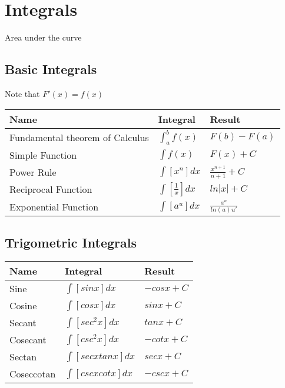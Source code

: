 \documentclass[17pt]{extarticle}
\begin{document}
\section{Integrals}
Area under the curve
\subsection{Basic Integrals}
Note that $F\prime(x)=f(x)$
\renewcommand{\arraystretch}{2}
\begin{table}[H]
\centering
\begin{tabular}{|l|l|l|}
\hline
\rowcolor{githublightgray}
Name & Integral & Result\\
\hline
Fundamental theorem of Calculus&$\int_{a}^{b}f(x)$&$F(b)-F(a)$\\
\hline
Simple Function & $\int f(x)$&$F(x)+C$\\
\hline
Power Rule & $\int [x^n]dx$&$\frac{x^{n+1}}{n+1}+C$\\
\hline
Reciprocal Function & $\int [\frac{1}{x}]dx$&$ln|x|+C$\\
\hline
Exponential Function & $\int [a^u]dx$&$\frac{a^u}{ln(a)u\prime}$\\
\hline
\end{tabular}
\end{table}

\subsection{Trigometric Integrals}
\renewcommand{\arraystretch}{2}
\begin{table}[H]
\centering
\begin{tabular}{|l|l|l|}
\hline
\rowcolor{githublightgray}
Name & Integral & Result\\
\hline
Sine & $\int[sinx]dx$ & $-cosx+C$\\
\hline
Cosine &$\int[cosx]dx$ & $sinx+C$\\
\hline
Secant &$\int[sec^2x]dx$&$tanx+C$\\
\hline
Cosecant &$\int[csc^2x]dx$&$-cotx+C$\\
\hline
Sectan &$\int[secxtanx]dx$&$secx+C$\\
\hline
Coseccotan&$\int[cscxcotx]dx$&$-cscx+C$\\
\hline
\end{tabular}
\end{table}
\clearpage
\end{document}
